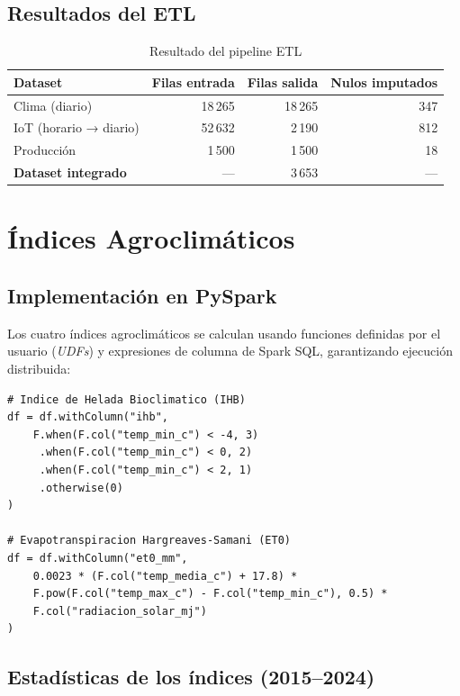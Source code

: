 \documentclass[12pt,a4paper]{article}
\begin{document}
\subsection{Resultados del ETL}

\begin{table}[H]
\centering
\caption{Resultado del pipeline ETL}
\label{tab:etl}
\begin{tabular}{lrrr}
\toprule
\textbf{Dataset} & \textbf{Filas entrada} & \textbf{Filas salida} & \textbf{Nulos imputados} \\
\midrule
Clima (diario)        & 18\,265 & 18\,265 &  347 \\
IoT (horario → diario) & 52\,632 & 2\,190  &  812 \\
Producción             & 1\,500  & 1\,500  &   18 \\
\textbf{Dataset integrado} & — & 3\,653 & — \\
\bottomrule
\end{tabular}
\end{table}

\section{Índices Agroclimáticos}

\subsection{Implementación en PySpark}

Los cuatro índices agroclimáticos se calculan usando funciones definidas
por el usuario (\textit{UDFs}) y expresiones de columna de Spark SQL,
garantizando ejecución distribuida:

\begin{lstlisting}[style=pythonstyle, caption={Cálculo de índices en PySpark}]
# Indice de Helada Bioclimatico (IHB)
df = df.withColumn("ihb",
    F.when(F.col("temp_min_c") < -4, 3)
     .when(F.col("temp_min_c") < 0, 2)
     .when(F.col("temp_min_c") < 2, 1)
     .otherwise(0)
)

# Evapotranspiracion Hargreaves-Samani (ET0)
df = df.withColumn("et0_mm",
    0.0023 * (F.col("temp_media_c") + 17.8) *
    F.pow(F.col("temp_max_c") - F.col("temp_min_c"), 0.5) *
    F.col("radiacion_solar_mj")
)
\end{lstlisting}

\subsection{Estadísticas de los índices (2015--2024)}
\end{document}
